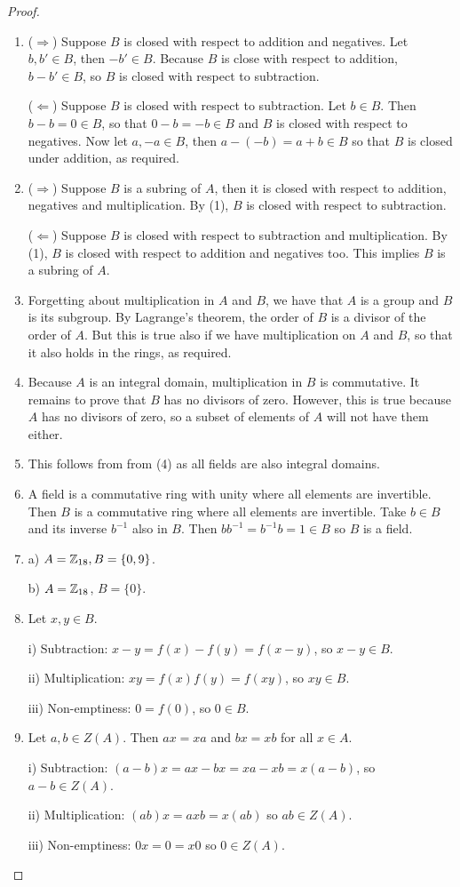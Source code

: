 \begin{proof}
 \begin{enumerate}
     \item ($\Rightarrow$) Suppose $B$ is closed with respect to addition and negatives. Let $b,b'\in B$, then $-b'\in B$. Because $B$ is close with respect to addition, $b-b'\in B$, so $B$ is closed with respect to subtraction.

     ($\Leftarrow$) Suppose $B$ is closed with respect to subtraction. Let $b\in B$. Then $b-b=0\in B$, so that $0-b=-b\in B$ and $B$ is closed with respect to negatives. Now let $a, -a\in B$, then $a-(-b)=a+b\in B$ so that $B$ is closed under addition, as required.
     \item ($\Rightarrow$) Suppose $B$ is a subring of $A$, then it is closed with respect to addition, negatives and multiplication. By (1), $B$ is closed with respect to subtraction.

     ($\Leftarrow$) Suppose $B$ is closed with respect to subtraction and multiplication. By (1), $B$ is closed with respect to addition and negatives too. This implies $B$ is a subring of $A$.
     \item Forgetting about multiplication in $A$ and $B$, we have that $A$ is a group and $B$ is its subgroup. By Lagrange's theorem, the order of $B$ is a divisor of the order of $A$. But this is true also if we have multiplication on $A$ and $B$, so that it also holds in the rings, as required.
     \item Because $A$ is an integral domain, multiplication in $B$ is commutative. It remains to prove that $B$ has no divisors of zero. However, this is true because $A$ has no divisors of zero, so a subset of elements of $A$ will not have them either.
     \item This follows from from (4) as all fields are also integral domains.
     \item A field is a commutative ring with unity where all elements are invertible. Then $B$ is a commutative ring where all elements are invertible. Take $b\in B$ and its inverse $b^{-1}$ also in $B$. Then $bb^{-1}=b^{-1}b=1\in B$ so $B$ is a field.
     \item a) $A=\mathbb{Z}_{18}, B=\{0,9\}$.

     b) $A=\mathbb{Z}_{18}$, $B=\{0\}$.
     \item Let $x,y\in B$. 

     i) Subtraction: $x-y=f(x)-f(y)=f(x-y)$, so $x-y\in B$.

     ii) Multiplication: $xy=f(x)f(y)=f(xy)$, so $xy\in B$.

     iii) Non-emptiness: $0=f(0)$, so $0\in B$.
     \item Let $a,b\in Z(A)$. Then $ax=xa$ and $bx=xb$ for all $x\in A$.
     
     i) Subtraction: $(a-b)x=ax-bx=xa-xb=x(a-b)$, so $a-b\in Z(A)$.

     ii) Multiplication: $(ab)x=axb=x(ab)$ so $ab\in Z(A)$.

     iii) Non-emptiness: $0x=0=x0$ so $0\in Z(A)$.
 \end{enumerate}
\end{proof}


